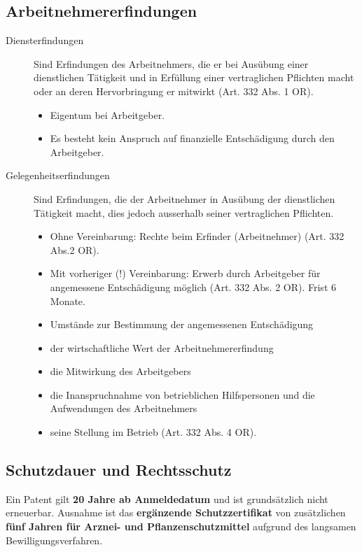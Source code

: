 \subsection{Arbeitnehmererfindungen}
\label{sec:Patentrecht-Arbeitnehmererfindungen}
\begin{description}
	\item[Diensterfindungen] Sind Erfindungen des Arbeitnehmers, die er
	bei Ausübung einer dienstlichen Tätigkeit und in Erfüllung einer
	vertraglichen Pflichten macht oder an deren Hervorbringung er mitwirkt
	(Art. 332 Abs. 1 OR).
	\begin{itemize}
		\item Eigentum bei Arbeitgeber.
		\item Es besteht kein Anspruch auf finanzielle Entschädigung
		durch den Arbeitgeber.
	\end{itemize}
	\item[Gelegenheitserfindungen] Sind Erfindungen, die der Arbeitnehmer
	in Ausübung der dienstlichen Tätigkeit macht, dies jedoch ausserhalb
	seiner vertraglichen Pflichten.
	\begin{itemize}
		\tightlist
		\item Ohne Vereinbarung: Rechte beim Erfinder (Arbeitnehmer) (Art. 332 Abs.2
		OR).
		\item Mit vorheriger (!) Vereinbarung: Erwerb durch Arbeitgeber für
		angemessene Entschädigung möglich (Art. 332 Abs. 2 OR). Frist 6
		Monate.
		\item Umstände zur Bestimmung der angemessenen Entschädigung
		\item der wirtschaftliche Wert der Arbeitnehmererfindung
		\item die Mitwirkung des Arbeitgebers
		\item die Inanspruchnahme von betrieblichen Hilfspersonen und die
		Aufwendungen des Arbeitnehmers
		\item seine Stellung im Betrieb (Art. 332 Abs. 4 OR).
	\end{itemize}
\end{description}

\subsection{Schutzdauer und Rechtsschutz}
Ein Patent gilt \textbf{20 Jahre ab Anmeldedatum} und ist grundsätzlich
nicht erneuerbar. Ausnahme ist das \textbf{ergänzende Schutzzertifikat}
von zusätzlichen \textbf{fünf Jahren für Arznei- und Pflanzenschutzmittel}
aufgrund des langsamen Bewilligungsverfahren.\\

